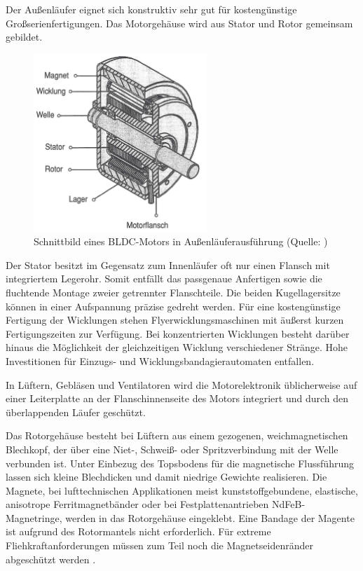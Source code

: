 Der Außenläufer eignet sich konstruktiv sehr gut für kostengünstige Großserienfertigungen. Das Motorgehäuse wird aus Stator und Rotor gemeinsam gebildet.

\begin{figure}[h]
  \centering
  \includegraphics[width=6.5cm]{./Grafiken/3_2}
  \caption[Schnittbild eines BLDC-Motors in Außenläuferausführung]{Schnittbild eines BLDC-Motors in Außenläuferausführung (Quelle: \parencite[S.  76]{Stölting2011})}
  \label{fig:3_2}
\end{figure}

Der Stator besitzt im Gegensatz zum Innenläufer oft nur einen Flansch mit integriertem Legerohr. Somit entfällt das passgenaue Anfertigen sowie die fluchtende Montage zweier getrennter Flanschteile. Die beiden Kugellagersitze können in einer Aufspannung präzise gedreht werden. Für eine kostengünstige Fertigung der Wicklungen stehen Flyerwicklungsmaschinen mit äußerst kurzen Fertigungszeiten zur Verfügung. Bei konzentrierten Wicklungen besteht darüber hinaus die Möglichkeit der gleichzeitigen Wicklung verschiedener Stränge. Hohe Investitionen für Einzugs- und Wicklungsbandagierautomaten entfallen.

In Lüftern, Gebläsen und Ventilatoren wird die Motorelektronik üblicherweise auf einer Leiterplatte an der Flanschinnenseite des Motors integriert und durch den überlappenden Läufer geschützt.

Das Rotorgehäuse besteht bei Lüftern aus einem gezogenen, weichmagnetischen Blechkopf, der über eine Niet-, Schweiß- oder Spritzverbindung mit der Welle verbunden ist. Unter Einbezug des Topsbodens für die magnetische Flussführung lassen sich kleine Blechdicken und damit niedrige Gewichte realisieren. Die Magnete, bei lufttechnischen Applikationen meist kunststoffgebundene, elastische, anisotrope Ferritmagnetbänder oder bei Festplattenantrieben NdFeB-Magnetringe, werden in das Rotorgehäuse eingeklebt. Eine Bandage der Magente ist aufgrund des Rotormantels nicht erforderlich. Für extreme Fliehkraftanforderungen müssen zum Teil noch die Magnetseidenränder abgeschützt werden \parencite[S.  76--77]{Stölting2011}.

